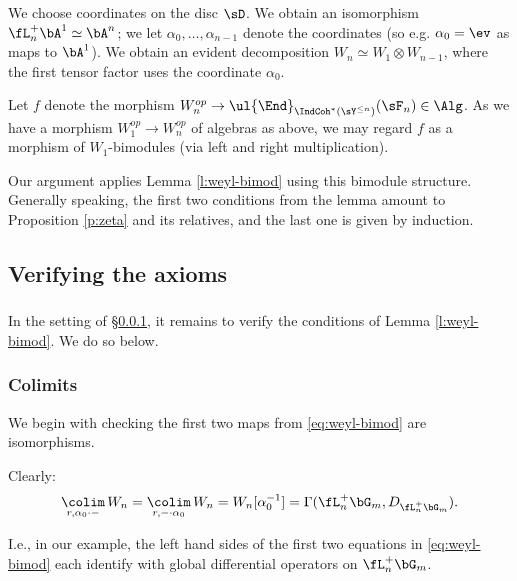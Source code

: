 \subsubsection{}\label{sss:ff-induction-strat}

We choose coordinates on the disc $\sD$. We obtain an isomorphism
$\fL_n^+ \bA^1 \simeq \bA^n$; we let $\alpha_0,\ldots,\alpha_{n-1}$ denote the coordinates
(so e.g. $\alpha_0 = \ev$ as maps to $\bA^1$).
We obtain an evident decomposition $W_n \simeq W_1 \otimes W_{n-1}$, where the first
tensor factor uses the coordinate $\alpha_0$.

Let $f$ denote the morphism $W_n^{op} \to \ul{\End}_{\IndCoh^*(\sY^{\leq n})}(\sF_n) \in \Alg$.
As we have a morphism $W_1^{op} \to W_n^{op}$ of algebras as above, we may regard $f$
as a morphism of $W_1$-bimodules (via left and right multiplication).

Our argument applies Lemma \ref{l:weyl-bimod} using this bimodule structure.
Generally speaking, the first two conditions from the lemma
amount to Proposition \ref{p:zeta} and its relatives,
and the last one is given by induction.

\subsection{Verifying the axioms} %

\subsubsection{}

In the setting of \S \ref{sss:ff-induction-strat},
it remains to verify the conditions of Lemma \ref{l:weyl-bimod}.
We do so below.

\subsubsection{Colimits}

We begin with checking the first two maps from \eqref{eq:weyl-bimod} are isomorphisms.

Clearly:
%
\[
\underset{r,\alpha_0\cdot-}{\colim} \, W_n = \underset{r,-\cdot \alpha_0}{\colim} \, W_n = W_n[\alpha_0^{-1}]
= \Gamma(\fL_n^+ \bG_m,D_{\fL_n^+ \bG_m}).
\]

 I.e., in our example, the left hand sides of the first two equations in \eqref{eq:weyl-bimod}
each identify with global differential operators on $\fL_n^+ \bG_m$.

